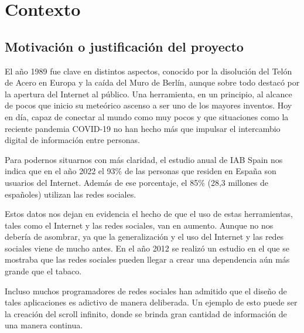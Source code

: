 \chapter{Contexto}\label{ch:context}

\section{Motivación o justificación del proyecto}

\vspace{0.3cm}

El año 1989 fue clave en distintos aspectos, conocido por la disolución del Telón de Acero en Europa y la caída del Muro de Berlín, aunque sobre todo destacó por la apertura del Internet al público. Una herramienta, en un principio, al alcance de pocos que inicio su meteórico ascenso a ser uno de los mayores inventos. Hoy en día, capaz de conectar al mundo como muy pocos y que situaciones como la reciente pandemia COVID-19 no han hecho más que impulsar el intercambio digital de información entre personas.

\vspace{0.3cm}

Para podernos situarnos con más claridad, el estudio anual de IAB Spain nos indica que en el año 2022 el 93\% de las personas que residen en España son usuarios del Internet. Además de ese porcentaje, el 85\% (28,3 millones de españoles) utilizan las redes sociales. \cite{Studio-Aloha}

\vspace{0.3cm}

Estos datos nos dejan en evidencia el hecho de que el uso de estas herramientas, tales como el Internet y las redes sociales, van en aumento. Aunque no nos debería de asombrar, ya que la generalización y el uso del Internet y las redes sociales viene de mucho antes. En el año 2012 se realizó un estudio en el que se mostraba que las redes sociales pueden llegar a crear una dependencia aún más grande que el tabaco. \cite{Tabaco-Study}

\vspace{0.3cm}

Incluso muchos programadores de redes sociales han admitido que el diseño de tales aplicaciones es adictivo de manera deliberada. Un ejemplo de esto puede ser la creación del scroll infinito, donde se brinda gran cantidad de información de una manera continua. \cite{Social-Deliberately}

